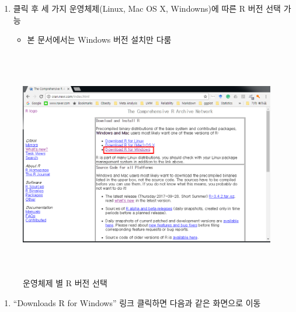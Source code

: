 \documentclass[11pt,a4paper]{book}
\providecommand{\tightlist}{%
  \setlength{\itemsep}{0pt}\setlength{\parskip}{0pt}}
\theoremstyle{definition}
\theoremstyle{definition}
\theoremstyle{definition}
\theoremstyle{remark}
\begin{document}
\begin{enumerate}
\def\labelenumi{\arabic{enumi}.}
\setcounter{enumi}{3}
\tightlist
\item
  클릭 후 세 가지 운영체제(Linux, Mac OS X, Windowns)에 따른 R 버전 선택
  가능

  \begin{itemize}
  \tightlist
  \item
    본 문서에서는 Windows 버전 설치만 다룸
  \end{itemize}
\end{enumerate}

\begin{figure}[H]
{
  \centering
  \includegraphics[width = 12cm, height = 10cm]{Figures/Rinstall-01.png}
  \caption[운영체제 별 R 버전 선택]{운영체제 별 R 버전 선택}\label{fig:R-install-03}
}
\end{figure}

\begin{enumerate}
\def\labelenumi{\arabic{enumi}.}
\setcounter{enumi}{4}
\tightlist
\item
  ``Downloads R for Windows'' 링크 클릭하면 다음과 같은 화면으로 이동
\end{enumerate}
\end{document}
